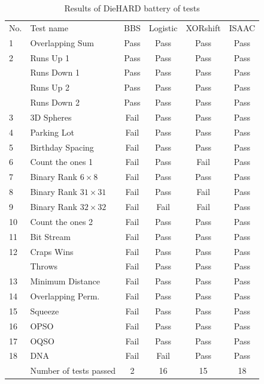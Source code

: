 \begin{tiny}
\begin{table}[!t]
\renewcommand{\arraystretch}{1.3}
\caption{Results of DieHARD battery of tests}
\label{Results of DieHARD battery}
\centering
\begin{tabular}{llcccc} \toprule
No. &Test name &BBS &Logistic& XORshift& ISAAC\\
1 & Overlapping Sum &Pass&Pass &Pass&Pass\\
2 & Runs Up 1 &Pass & Pass &Pass&Pass\\
&Runs Down 1 &Pass &Pass &Pass&Pass\\
&Runs Up 2 &Pass &Pass &Pass&Pass\\
&Runs Down 2 &Pass & Pass &Pass&Pass\\
3 & 3D Spheres &Fail &Pass &Pass&Pass\\
4 & Parking Lot &Fail &Pass &Pass&Pass\\
5 & Birthday Spacing &Fail &Pass &Pass&Pass\\
6 & Count the ones 1 &Fail &Pass &Fail&Pass\\
7 &Binary Rank $6 \times 8$ &Fail & Pass &Pass&Pass\\
8 &Binary Rank $31 \times 31$ &Fail &Pass &Fail&Pass\\
9 &Binary Rank $32 \times 32$ &Fail &Fail &Fail&Pass\\
10 &Count the ones 2 &Fail &Pass&Pass&Pass \\
11 &Bit Stream &Fail &Pass&Pass&Pass \\
12 &Craps Wins &Fail &Pass&Pass&Pass \\
&Throws &Fail &Pass&Pass&Pass\\
13 &Minimum Distance &Fail &Pass &Pass&Pass\\
14 &Overlapping Perm. &Fail&Pass &Pass&Pass\\
15 &Squeeze &Fail &Pass &Pass&Pass \\
16 &OPSO &Fail &Pass &Pass&Pass \\
17 &OQSO &Fail &Pass &Pass&Pass \\
18 &DNA &Fail &Fail &Pass &Pass\\
&Number of tests passed &2&16 &15&18 \\ \bottomrule
\end{tabular}
\end{table}
\end{tiny}




